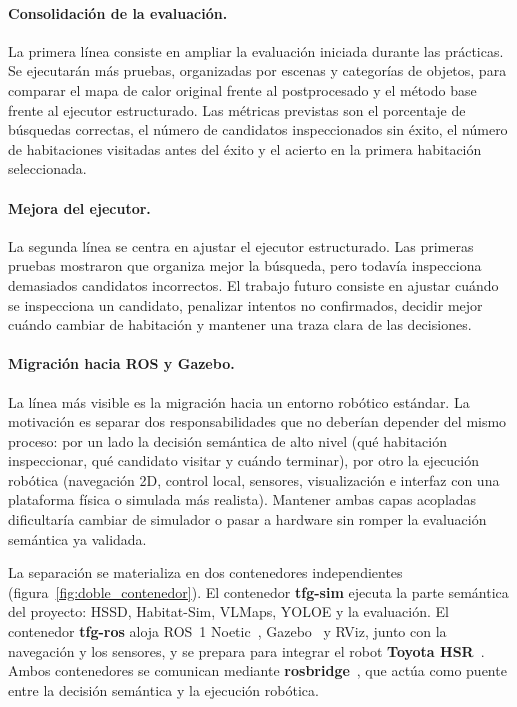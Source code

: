\documentclass[11pt,fleqn,openany]{book} %
\let\cite=\parencite
\begin{document}
\paragraph{Consolidación de la evaluación.} La primera línea consiste en ampliar la evaluación iniciada durante las prácticas. Se ejecutarán más pruebas, organizadas por escenas y categorías de objetos, para comparar el mapa de calor original frente al postprocesado y el método base frente al ejecutor estructurado. Las métricas previstas son el porcentaje de búsquedas correctas, el número de candidatos inspeccionados sin éxito, el número de habitaciones visitadas antes del éxito y el acierto en la primera habitación seleccionada.

\paragraph{Mejora del ejecutor.} La segunda línea se centra en ajustar el ejecutor estructurado. Las primeras pruebas mostraron que organiza mejor la búsqueda, pero todavía inspecciona demasiados candidatos incorrectos. El trabajo futuro consiste en ajustar cuándo se inspecciona un candidato, penalizar intentos no confirmados, decidir mejor cuándo cambiar de habitación y mantener una traza clara de las decisiones.

\paragraph{Migración hacia ROS y Gazebo.} La línea más visible es la migración hacia un entorno robótico estándar. La motivación es separar dos responsabilidades que no deberían depender del mismo proceso: por un lado la decisión semántica de alto nivel (qué habitación inspeccionar, qué candidato visitar y cuándo terminar), por otro la ejecución robótica (navegación 2D, control local, sensores, visualización e interfaz con una plataforma física o simulada más realista). Mantener ambas capas acopladas dificultaría cambiar de simulador o pasar a hardware sin romper la evaluación semántica ya validada.

La separación se materializa en dos contenedores independientes (figura~\ref{fig:doble_contenedor}). El contenedor \textbf{tfg-sim} ejecuta la parte semántica del proyecto: HSSD, Habitat-Sim, VLMaps, YOLOE y la evaluación. El contenedor \textbf{tfg-ros} aloja ROS~1 Noetic~\cite{quigley2009ros}, Gazebo~\cite{koenig2004gazebo} y RViz, junto con la navegación y los sensores, y se prepara para integrar el robot \textbf{Toyota HSR}~\cite{yamamoto2019hsr}. Ambos contenedores se comunican mediante \textbf{rosbridge}~\cite{crick2017rosbridge}, que actúa como puente entre la decisión semántica y la ejecución robótica.
\end{document}
